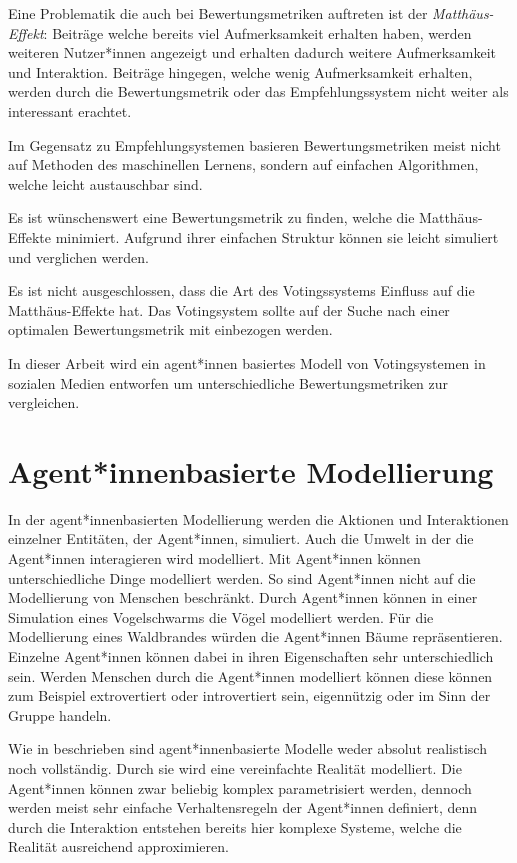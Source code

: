 Eine Problematik die auch bei Bewertungsmetriken auftreten ist der \textit{Matthäus-Effekt}: Beiträge welche bereits viel Aufmerksamkeit erhalten haben, werden weiteren Nutzer*innen angezeigt und erhalten dadurch weitere Aufmerksamkeit und Interaktion. Beiträge hingegen, welche wenig Aufmerksamkeit erhalten, werden durch die Bewertungsmetrik oder das Empfehlungssystem nicht weiter als interessant erachtet.

Im Gegensatz zu Empfehlungsystemen basieren Bewertungsmetriken meist nicht auf Methoden des maschinellen Lernens, sondern auf einfachen Algorithmen, welche leicht austauschbar sind.

Es ist wünschenswert eine Bewertungsmetrik zu finden, welche die Matthäus-Effekte minimiert. Aufgrund ihrer einfachen Struktur können sie leicht simuliert und verglichen werden.

Es ist nicht ausgeschlossen, dass die Art des Votingssystems Einfluss auf die Matthäus-Effekte hat. Das Votingsystem sollte auf der Suche nach einer optimalen Bewertungsmetrik mit einbezogen werden.

In dieser Arbeit wird ein agent*innen basiertes Modell von Votingsystemen in sozialen Medien entworfen um unterschiedliche Bewertungsmetriken zur vergleichen.

\section{Agent*innenbasierte Modellierung}

In der agent*innenbasierten Modellierung werden die Aktionen und Interaktionen einzelner Entitäten, der Agent*innen, simuliert. Auch die Umwelt in der die Agent*innen interagieren wird modelliert. Mit Agent*innen können unterschiedliche Dinge modelliert werden. So sind Agent*innen nicht auf die Modellierung von Menschen beschränkt. Durch Agent*innen können in einer Simulation eines Vogelschwarms die Vögel modelliert werden. Für die Modellierung eines Waldbrandes würden die Agent*innen Bäume repräsentieren. Einzelne Agent*innen können dabei in ihren Eigenschaften sehr unterschiedlich sein. Werden Menschen durch die Agent*innen modelliert können diese können zum Beispiel extrovertiert oder introvertiert sein, eigennützig oder im Sinn der Gruppe handeln.


Wie in \cite{Burbach20203} beschrieben sind agent*innenbasierte Modelle weder absolut realistisch noch vollständig. Durch sie wird eine vereinfachte Realität modelliert. Die Agent*innen können zwar beliebig komplex parametrisiert werden, dennoch werden meist sehr einfache Verhaltensregeln der Agent*innen definiert, denn durch die Interaktion entstehen bereits hier komplexe Systeme, welche die Realität ausreichend approximieren.

